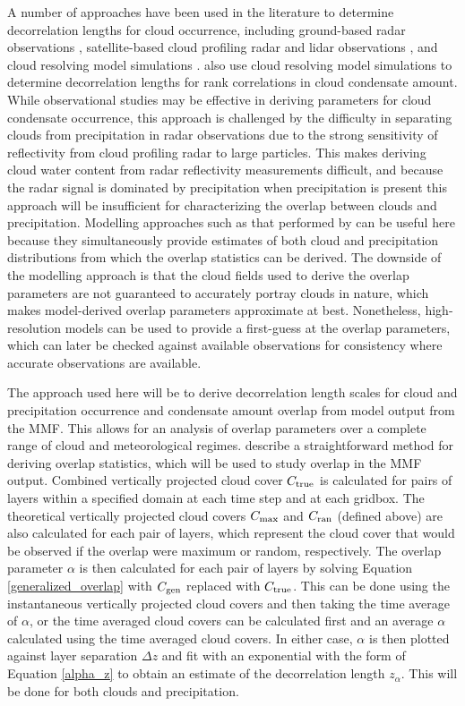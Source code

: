 \documentclass[letter]{article}
\begin{document}
A number of approaches have been used in the literature to determine decorrelation lengths for cloud occurrence, including ground-based radar observations \citep{hogan_and_illingworth_2000}, satellite-based cloud profiling radar and lidar observations \citep{barker_2008,oreopoulos_et_al_2012}, and cloud resolving model simulations \citep{raisanen_et_al_2004,pincus_et_al_2005}. \cite{pincus_et_al_2005} also use cloud resolving model simulations to determine decorrelation lengths for rank correlations in cloud condensate amount. While observational studies may be effective in deriving parameters for cloud condensate occurrence, this approach is challenged by the difficulty in separating clouds from precipitation in radar observations due to the strong sensitivity of reflectivity from cloud profiling radar to large particles. This makes deriving cloud water content from radar reflectivity measurements difficult, and because the radar signal is dominated by precipitation when precipitation is present this approach will be insufficient for characterizing the overlap between clouds and precipitation. Modelling approaches such as that performed by \cite{pincus_et_al_2005} can be useful here because they simultaneously provide estimates of both cloud and precipitation distributions from which the overlap statistics can be derived. The downside of the modelling approach is that the cloud fields used to derive the overlap parameters are not guaranteed to accurately portray clouds in nature, which makes model-derived overlap parameters approximate at best. Nonetheless, high-resolution models can be used to provide a first-guess at the overlap parameters, which can later be checked against available observations for consistency where accurate observations are available.

The approach used here will be to derive decorrelation length scales for cloud and precipitation occurrence and condensate amount overlap from model output from the MMF. This allows for an analysis of overlap parameters over a complete range of cloud and meteorological regimes. \cite{pincus_et_al_2005} describe a straightforward method for deriving overlap statistics, which will be used to study overlap in the MMF output. Combined vertically projected cloud cover $C_{\rm true}$ is calculated for pairs of layers within a specified domain at each time step and at each gridbox. The theoretical vertically projected cloud covers $C_{\rm max}$ and $C_{\rm ran}$ (defined above) are also calculated for each pair of layers, which represent the cloud cover that would be observed if the overlap were maximum or random, respectively. The overlap parameter $\alpha$ is then calculated for each pair of layers by solving Equation \ref{generalized_overlap} with $C_{\rm gen}$ replaced with $C_{\rm true}$. This can be done using the instantaneous vertically projected cloud covers and then taking the time average of $\alpha$, or the time averaged cloud covers can be calculated first and an average $\alpha$ calculated using the time averaged cloud covers. In either case, $\alpha$ is then plotted against layer separation $\Delta z$ and fit with an exponential with the form of Equation \ref{alpha_z} to obtain an estimate of the decorrelation length $z_{\alpha}$. This will be done for both clouds and precipitation.
\end{document}
